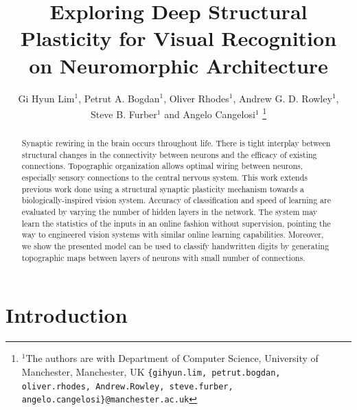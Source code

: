 \documentclass[letterpaper, 10 pt, conference]{ieeeconf}  %
\title{Exploring Deep Structural Plasticity for Visual Recognition on Neuromorphic Architecture}
\author{Gi Hyun Lim$^{1}$, Petrut A. Bogdan$^{1}$, Oliver Rhodes$^{1}$, Andrew G. D. Rowley$^{1}$, \\ 
         Steve B. Furber$^{1}$ and Angelo Cangelosi$^{1}$%
\thanks{$^{1}$The authors are with Department of Computer Science, University of Manchester, Manchester, UK
{\tt\small \{gihyun.lim, petrut.bogdan, oliver.rhodes, Andrew.Rowley, steve.furber, angelo.cangelosi\}@manchester.ac.uk}}%
}
\begin{document}
\maketitle
\thispagestyle{empty}
\pagestyle{empty}


\begin{abstract}
Synaptic rewiring in the brain occurs throughout life. There is tight interplay between structural changes in the connectivity between neurons and the efficacy of existing connections. Topographic organization allows optimal wiring between neurons, especially sensory connections to the central nervous system.
This work extends previous work done using a structural synaptic plasticity mechanism towards a biologically-inspired vision system. Accuracy of classification and speed of learning are evaluated by varying the number of hidden layers in the network. 
The system may learn the statistics of the inputs in an online fashion without supervision, pointing the way to engineered vision systems with similar online learning capabilities.
Moreover, we show the presented model can be used to classify handwritten digits by generating topographic maps between layers of neurons with small number of connections.

\end{abstract}

\section{Introduction}
\end{document}
